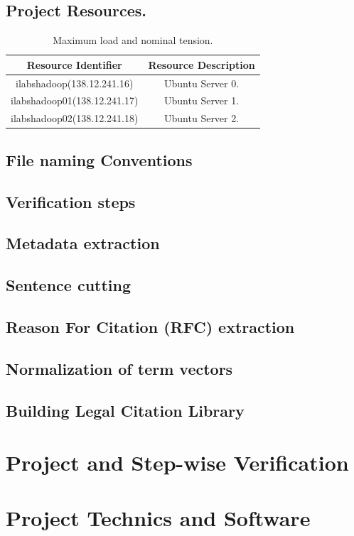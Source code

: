 \documentclass[12pt]{article}
\begin{document}
\subsection{Project Resources.}
\begin{table}[tp] %
\centering 
\begin{tabular}{|c|c|}
\hline %
\textbf{Resource Identifier} & \textbf{Resource Description} \\ \hline %
ilabshadoop(138.12.241.16) & Ubuntu Server 0. \\ \hline %
ilabshadoop01(138.12.241.17) & Ubuntu Server 1. \\\hline%
ilabshadoop02(138.12.241.18) & Ubuntu Server 2. \\\hline%
\end{tabular}
\caption{Maximum load and nominal tension.}
\label{tbl:proj_resource}%
\end{table}

\subsection{File naming Conventions}

\subsection{Verification steps}

\subsection{Metadata extraction}

\subsection{Sentence cutting}

\subsection{Reason For Citation (RFC) extraction}

\subsection{Normalization of term vectors}

\subsection{Building Legal Citation Library}

\section{Project and Step-wise Verification}

\section{Project Technics and Software}
\end{document}
